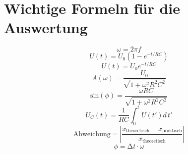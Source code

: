 \section{Wichtige Formeln für die Auswertung}
\begin{equation}
  \omega = 2\pi f
  \label{eqn:frequenz}
\end{equation}
\begin{equation}
  U(t)=U_0\left(1-e^{-t/RC}\right)
  \label{eqn:aufladen}
\end{equation}
\begin{equation}
  U(t)=U_0e^{-t/RC}
  \label{eqn:entladen}
\end{equation}
\begin{equation}
  A(\omega)=\frac{U_0}{\sqrt{1+\omega^2R^2C^2}}
  \label{eqn:amplitude}
\end{equation}
\begin{equation}
  \text{sin}(\phi)=\frac{\omega RC}{\sqrt{1+\omega^2R^2C^2}}
  \label{eqn:phase}
\end{equation}
\begin{equation}
  U_C(t)=\frac{1}{RC}\int_0^tU(t')d\, t'
  \label{eqn:integral}
\end{equation}
\begin{equation}
  \text{Abweichung} = \left|\frac{x_\text{theoretisch}-x_\text{praktisch}}{x_\text{theoretisch}}\right|
  \label{eqn:abweichung}
\end{equation}
\begin{equation}
  \phi = \increment t \cdot\omega
  \label{eqn:phasenberechnung}
\end{equation}
